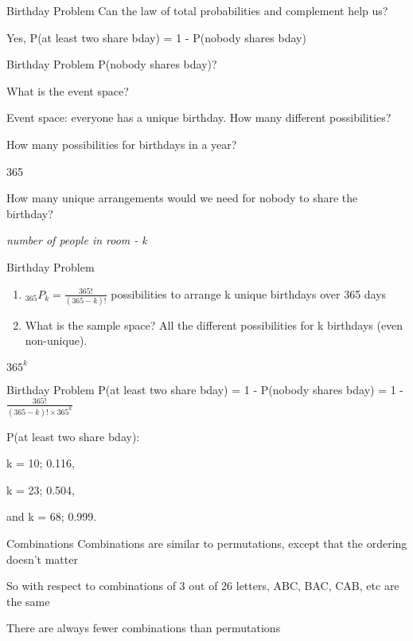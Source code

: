 \documentclass[presentation]{beamer}
\begin{document}
\begin{frame}[label={sec:orga1aacc3}]{Birthday Problem}
Can the law of total probabilities and complement help us?

\pause

Yes, P(at least two share bday) = 1 - P(nobody shares bday)
\end{frame}

\begin{frame}[label={sec:org8758f00}]{Birthday Problem}
P(nobody shares bday)?

What is the event space?

\pause

Event space:  everyone has a unique birthday. How many different possibilities?

\pause

How many possibilities for birthdays in a year?

\pause

365

\pause

How many unique arrangements would we need for nobody to share the birthday?

\emph{number of people in room - k}
\end{frame}

\begin{frame}[label={sec:org70331a2}]{Birthday Problem}
\begin{enumerate}
\item \(_{365}P_{k} = \frac{365!}{(365-k)!}\) possibilities to arrange k unique birthdays over 365 days

\item What is the sample space? \alert{All the different possibilities for k birthdays (even non-unique).}
\end{enumerate}

\pause
\(365^{k}\)
\end{frame}

\begin{frame}[label={sec:org51f3a5f}]{Birthday Problem}
P(at least two share bday) = 1 - P(nobody shares bday) = 1 - \(\frac{365!}{(365-k)! \times 365^{k}}\)

\pause

P(at least two share bday):

k = 10; 0.116,

k = 23; 0.504,

and k = 68; 0.999.
\end{frame}


\begin{frame}[label={sec:orgb715318}]{Combinations}
Combinations are similar to permutations, except that the ordering doesn't matter

So with respect to combinations of 3 out of 26 letters, ABC, BAC, CAB, etc are the same

\pause

There are \alert{always} fewer combinations than permutations
\end{frame}
\end{document}
